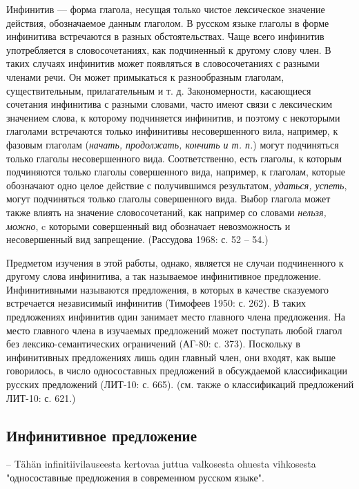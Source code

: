 Инфинитив --- форма глагола, несущая только чистое лексическое значение действия, обозначаемое данным глаголом. В русском языке глаголы в форме инфинитива встречаются в разных обстоятельствах. Чаще всего инфинитив употребляется в словосочетаниях, как подчиненный к другому слову член. В таких случаях инфинитив может появляться в словосочетаниях с разными членами речи. Он может примыкаться к разнообразным глаголам, существительным, прилагательным и т. д. Закономерности, касающиеся сочетания инфинитива с разными словами, часто имеют связи с лексическим значением слова, к которому подчиняется инфинитив, и поэтому с некоторыми глаголами встречаются только инфинитивы несовершенного вила, например, к фазовым глаголам (\textit{начать, продолжать, кончить и т. п.}) могут подчиняться только глаголы несовершенного вида. Соответственно, есть глаголы, к которым подчиняются только глаголы совершенного вида, например, к глаголам, которые обозначают одно целое действие с получившимся результатом, \textit{удаться, успеть}, могут подчиняться только глаголы совершенного вида. Выбор глагола может также влиять на значение словосочетаний, как например со словами \textit{нельзя, можно}, c которыми совершенный вид обозначает невозможность и несовершенный вид запрещение. (Рассудова 1968: с. 52 -- 54.)

Предметом изучения в этой работы, однако, является не случаи подчиненного к другому слова инфинитива, а так называемое инфинитивное предложение. Инфинитивными называются предложения, в которых в качестве сказуемого встречается независимый инфинитив (Тимофеев 1950: с. 262). В таких предложениях инфинитив один занимает место главного члена предложения. На место главного члена в изучаемых предложений может поступать любой глагол без лексико-семантических ограничений (АГ-80: с. 373). Поскольку в инфинитивных предложениях лишь один главный член, они входят, как выше говорилось, в число односоставных предложений в обсуждаемой классификации русских предложений (ЛИТ-10: с. 665). (см. также о классификаций предложений ЛИТ-10: с. 621.)

\subsection{Инфинитивное предложение}

-- Tähän infinitiivilauseesta kertovaa juttua valkosesta ohuesta vihkosesta "односоставные предложения в современном русском языке".



